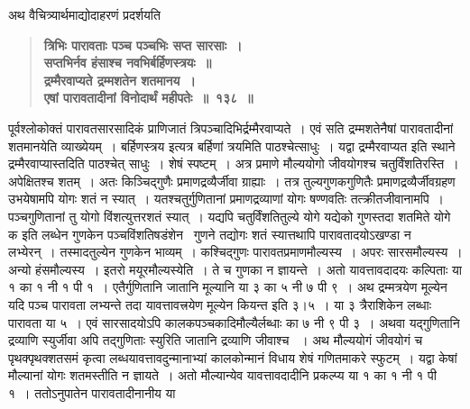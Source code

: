 \documentclass[11pt, openany]{book}
\begin{document}
\newpage

\begin{sloppypar}
{\small अथ वैचित्र्यार्थमाद्योदाहरणं प्रदर्शयति\textendash }

 \label{9.138}
\begin{quote}
{\large \textbf{{\color{purple}त्रिभिः पारावताः पञ्च पञ्चभिः सप्त सारसाः~।\\
सप्तभिर्नव हंसाश्च नवभिर्बर्हिणस्त्रयः~॥\\
द्रम्मैरवाप्यते द्रम्मशतेन शतमानय~।\\
एषां पारावतादीनां विनोदार्थं महीपतेः~॥~१३८~॥}}}
\end{quote}

पूर्वश्लोकोक्तं पारावतसारसादिकं प्राणिजातं त्रिपञ्चादिभिर्द्रम्मैरवाप्यते~। एवं सति द्रम्मशतेनैषां पारावतादीनां शतमानयेति व्याख्येयम्~। बर्हिणस्त्रय इत्यत्र बर्हिणां त्रयमिति पाठश्चेत्साधुः~। यद्वा द्रम्मैरवाप्यत इति स्थाने द्रम्मैरवाप्यास्तदिति पाठश्चेत् साधुः~। शेषं स्पष्टम्~। अत्र प्रमाणे मौल्ययोगो जीवयोगश्च चतुर्विंशतिरस्ति~। अपेक्षितश्च शतम्~। अतः किञ्चिद्गुणैः प्रमाणद्रव्यैर्जीवा ग्राह्याः~। तत्र तुल्यगुणकगुणितैः प्रमाणद्रव्यैर्जीवग्रहण उभयेषामपि योगः शतं न स्यात्~। यतश्चतुर्गुणितानां प्रमाणद्रव्याणां योगः षण्णवतिः तत्क्रीतजीवानामपि~। पञ्चगुणितानां तु योगो विंशत्युत्तरशतं स्यात्~। यद्यपि चतुर्विंशतितुल्ये योगे यद्येको गुणस्तदा शतमिते योगे क इति लब्धेन गुणकेन पञ्चविंशतिषडंशेन \, गुणने तद्योगः शतं स्यात्तथापि पारावतादयोऽखण्डा न लभ्येरन्~। तस्मादतुल्येन गुणकेन भाव्यम्~। कश्चिद्गुणः पारावतप्रमाणमौल्यस्य~। अपरः सारसमौल्यस्य~। अन्यो हंसमौल्यस्य~। इतरो मयूरमौल्यस्येति~। ते च गुणका न ज्ञायन्ते~। अतो यावत्तावदादयः कल्पिताः या १ का १ नी १ पी १~। एतैर्गुणितानि जातानि मूल्यानि या ३ का ५ नी ७ पी ९~। अथ द्रम्मत्रयेण मूल्येन यदि पञ्च पारावता लभ्यन्ते तदा यावत्तावत्त्रयेण मूल्येन कियन्त इति ३।५~। या ३ त्रैराशिकेन लब्धाः पारावता या ५~। एवं सारसादयोऽपि कालकपञ्चकादिमौल्यैर्लब्धाः का ७ नी ९ पी ३~। अथवा यद्गुणितानि द्रव्याणि स्युर्जीवा अपि तद्गुणिताः स्युरिति जातानि द्रव्याणि जीवाश्च ~। अथ मौल्ययोगं जीवयोगं च पृथक्पृथक्शतसमं कृत्वा लब्धयावत्तावदुन्मानाभ्यां कालकोन्मानं विधाय शेषं गणितमाकरे स्फुटम्~। यद्वा केषां मौल्यानां योगः शतमस्तीति न ज्ञायते~। अतो मौल्यान्येव यावत्तावदादीनि प्रकल्प्य या १ का १ नी १ पी १~। ततोऽनुपातेन पारावतादीनानीय या \;{\small $\begin{matrix}

\end{matrix}}
\end{sloppypar}
\end{document}
